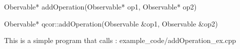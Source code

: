 
\begin{apidefinition}

\begin{Csynopsis}
    Obervable* addOperation(Observable* op1, Observable* op2)
\end{Csynopsis}

\begin{Cppsynopsis}
    Obervable* qcor::addOperation(Observable &op1, Observable &op2)
\end{Cppsynopsis}


\begin{apiarguments}
\end{apiarguments}



\apinotes{
    
}

\begin{apiexamples}

\apicppexample
    { This is a simple program that calls : } 
    { example_code/addOperation_ex.cpp} 
    {}

\end{apiexamples}

\end{apidefinition}
